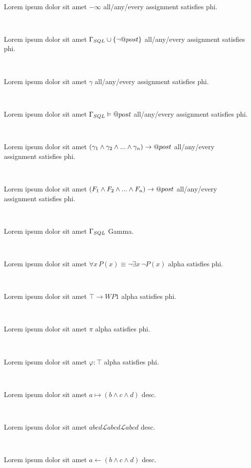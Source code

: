 \documentclass[12pt]{article}
\begin{document}
\centerline{~}

Lorem ipsum dolor sit amet $ - \infty $ all/any/every assignment satisfies phi.

\centerline{~}

Lorem ipsum dolor sit amet $ \Gamma_{\scriptsize SQL} \cup \{\neg @post\} $ all/any/every assignment satisfies phi.

\centerline{~}

Lorem ipsum dolor sit amet $ \gamma $ all/any/every assignment satisfies phi.

\centerline{~}

Lorem ipsum dolor sit amet $ \Gamma_{\scriptsize SQL} \vDash @post $ all/any/every assignment satisfies phi.

\centerline{~}

Lorem ipsum dolor sit amet $ ( \gamma_{\scriptsize 1} \wedge \gamma_{\scriptsize 2} \wedge ... \wedge \gamma_{\scriptsize n} ) \rightarrow @post $ all/any/every assignment satisfies phi.

\centerline{~}

Lorem ipsum dolor sit amet $ ( F_{\scriptsize 1} \wedge F_{\scriptsize 2} \wedge ... \wedge F_{\scriptsize n} ) \rightarrow @post $ all/any/every assignment satisfies phi.

\centerline{~}

Lorem ipsum dolor sit amet $ \Gamma_{\scriptsize SQL} $ Gamma.

\centerline{~}

Lorem ipsum dolor sit amet $ \forall x \, P(x) \equiv \neg \exists x \, \neg P(x)  $ alpha satisfies phi.

\centerline{~}

Lorem ipsum dolor sit amet $ \top \rightarrow WP1 $ alpha satisfies phi.

\centerline{~}

Lorem ipsum dolor sit amet $ \pi $ alpha satisfies phi.

\centerline{~}

Lorem ipsum dolor sit amet $ \varphi : \top $ alpha satisfies phi.

\centerline{~}

Lorem ipsum dolor sit amet $ a \mapsto ( b \wedge c \wedge d )  $ desc.

\centerline{~}

Lorem ipsum dolor sit amet $ abcd \mathscr{L} abcd \mathcal{L}  abcd $ desc.

\centerline{~}

Lorem ipsum dolor sit amet $ a \leftarrow ( b \wedge c \wedge d )  $ desc.
\end{document}
